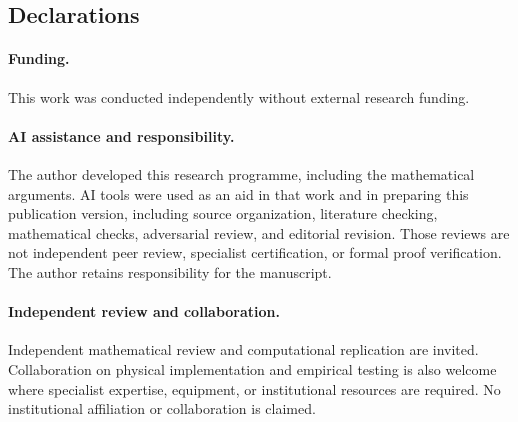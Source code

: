 \documentclass[11pt]{article}
\numberwithin{equation}{section}
\theoremstyle{definition}
\begin{document}
\begin{samepage}
\section*{Declarations}
\paragraph{Funding.} This work was conducted independently without external research funding.

\paragraph{AI assistance and responsibility.} The author developed this research programme, including the mathematical arguments. AI tools were used as an aid in that work and in preparing this publication version, including source organization, literature checking, mathematical checks, adversarial review, and editorial revision. Those reviews are not independent peer review, specialist certification, or formal proof verification. The author retains responsibility for the manuscript.

\paragraph{Independent review and collaboration.} Independent mathematical review and computational replication are invited. Collaboration on physical implementation and empirical testing is also welcome where specialist expertise, equipment, or institutional resources are required. No institutional affiliation or collaboration is claimed.

\end{samepage}
\renewcommand{\bibfont}{\small}
\setlength{\bibsep}{2pt}
\nocite{Rodgers2026,PortfolioReturn,PortfolioEquilibrium,PortfolioPilot,PortfolioRecords,OriginalMonograph,OriginalPilot,OriginalMassive}
\end{document}
